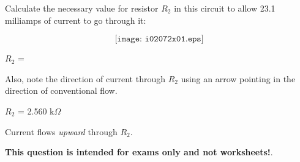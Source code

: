 

Calculate the necessary value for resistor $R_2$ in this circuit to allow 23.1 milliamps of current to go through it:

$$\texttt{[image: i02072x01.eps]}$$

$R_2$ = 

\vskip 10pt

Also, note the direction of current through $R_2$ using an arrow pointing in the direction of conventional flow.







$R_2$ = 2.560 k$\Omega$

\vskip 10pt

Current flows {\it upward} through $R_2$.







{\bf This question is intended for exams only and not worksheets!}.


